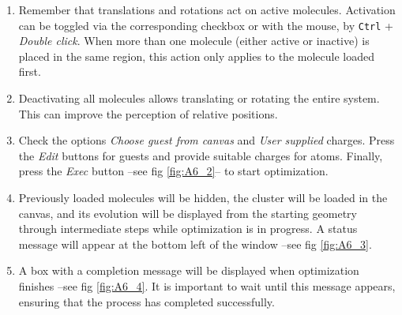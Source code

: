 \documentclass[10pt]{article}
\begin{document}
\begin{enumerate}
\item Remember that translations and rotations act on active molecules.
Activation can be toggled via the corresponding checkbox or with the mouse, by
\texttt{Ctrl} + {\it Double click}. When more than one molecule 
(either active or inactive) is placed in the same region, this action
only applies to the molecule loaded first.

\item Deactivating all molecules allows translating or rotating the entire system.
This can improve the perception of relative positions.

\item Check the options {\it Choose guest from canvas} and {\it User supplied} 
charges. Press the {\it Edit} buttons for guests and provide suitable charges 
for atoms. Finally, press
the {\it Exec} button  --see fig \ref{fig:A6_2}-- to start optimization.

\item Previously loaded molecules will be hidden, the cluster 
will be loaded in the canvas, and its evolution will be
displayed from the starting geometry through intermediate steps
while optimization is in progress. A status message will appear at the bottom left of the window
--see fig \ref{fig:A6_3}.

\item A box with a completion message will be displayed when optimization finishes
--see fig \ref{fig:A6_4}.
It is important to wait until this message appears, ensuring that
the process has completed successfully.


\end{enumerate}
\end{document}
